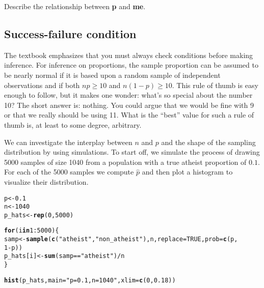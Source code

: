 \documentclass{article}\usepackage[]{graphicx}\usepackage[]{color}
\makeatletter
\newcommand{\hlnum}[1]{\textcolor[rgb]{0.686,0.059,0.569}{#1}}%
\newcommand{\hlstr}[1]{\textcolor[rgb]{0.192,0.494,0.8}{#1}}%
\newcommand{\hlopt}[1]{\textcolor[rgb]{0,0,0}{#1}}%
\newcommand{\hlstd}[1]{\textcolor[rgb]{0.345,0.345,0.345}{#1}}%
\newcommand{\hlkwa}[1]{\textcolor[rgb]{0.161,0.373,0.58}{\textbf{#1}}}%
\newcommand{\hlkwb}[1]{\textcolor[rgb]{0.69,0.353,0.396}{#1}}%
\newcommand{\hlkwc}[1]{\textcolor[rgb]{0.333,0.667,0.333}{#1}}%
\newcommand{\hlkwd}[1]{\textcolor[rgb]{0.737,0.353,0.396}{\textbf{#1}}}%
\newenvironment{kframe}{%
 \def\at@end@of@kframe{}%
 \ifinner\ifhmode%
  \def\at@end@of@kframe{\end{minipage}}%
  \begin{minipage}{\columnwidth}%
 \fi\fi%
 \def\FrameCommand##1{\hskip\@totalleftmargin \hskip-\fboxsep
 \colorbox{shadecolor}{##1}\hskip-\fboxsep
     \hskip-\linewidth \hskip-\@totalleftmargin \hskip\columnwidth}%
 \MakeFramed {\advance\hsize-\width
   \@totalleftmargin\z@ \linewidth\hsize
   \@setminipage}}%
 {\par\unskip\endMakeFramed%
 \at@end@of@kframe}
\newenvironment{knitrout}{}{} %
\makeatother
\begin{document}
\begin{exercise}
Describe the relationship between \hlkwd{p} and \hlkwd{me}.
\end{exercise}

\subsection*{Success-failure condition}
The textbook emphasizes that you must always check conditions before making inference. For inference on proportions, the sample proportion can be assumed to be nearly normal if it is based upon a random sample of independent observations and if both $np \geq 10$ and $n(1 - p) \geq 10$. This rule of thumb is easy enough to follow, but it makes one wonder: what's so special about the number 10? The short answer is: nothing. You could argue that we would be fine with 9 or that we really should be using 11. What is the ``best'' value for such a rule of thumb is, at least to some degree, arbitrary.

We can investigate the interplay between $n$ and $p$ and the shape of the sampling distribution by using simulations. To start off, we simulate the process of drawing 5000 samples of size 1040 from a population with a true atheist proportion of $0.1$. For each of the 5000 samples we compute $\hat{p}$ and then plot a histogram to visualize their distribution.

\begin{knitrout}
\color{fgcolor}\begin{kframe}
\begin{alltt}
\hlstd{p} \hlkwb{<-} \hlnum{0.1}
\hlstd{n} \hlkwb{<-} \hlnum{1040}
\hlstd{p_hats} \hlkwb{<-} \hlkwd{rep}\hlstd{(}\hlnum{0}\hlstd{,} \hlnum{5000}\hlstd{)}

\hlkwa{for} \hlstd{(i} \hlkwa{in} \hlnum{1}\hlopt{:}\hlnum{5000}\hlstd{) \{}
    \hlstd{samp} \hlkwb{<-} \hlkwd{sample}\hlstd{(}\hlkwd{c}\hlstd{(}\hlstr{"atheist"}\hlstd{,} \hlstr{"non_atheist"}\hlstd{), n,} \hlkwc{replace} \hlstd{=} \hlnum{TRUE}\hlstd{,} \hlkwc{prob} \hlstd{=} \hlkwd{c}\hlstd{(p,}
        \hlnum{1} \hlopt{-} \hlstd{p))}
    \hlstd{p_hats[i]} \hlkwb{<-} \hlkwd{sum}\hlstd{(samp} \hlopt{==} \hlstr{"atheist"}\hlstd{)}\hlopt{/}\hlstd{n}
\hlstd{\}}

\hlkwd{hist}\hlstd{(p_hats,} \hlkwc{main} \hlstd{=} \hlstr{"p = 0.1, n = 1040"}\hlstd{,} \hlkwc{xlim} \hlstd{=} \hlkwd{c}\hlstd{(}\hlnum{0}\hlstd{,} \hlnum{0.18}\hlstd{))}
\end{alltt}
\end{kframe}
\end{knitrout}
\end{document}
